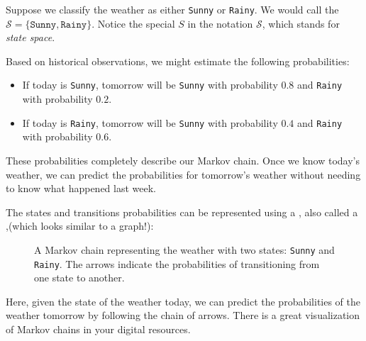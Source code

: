 Suppose we classify the weather as either \texttt{Sunny} or \texttt{Rainy}. We would call the  $\mathcal{S} = \{\texttt{Sunny}, \texttt{Rainy}\}$. Notice the special $S$ in the notation $\mathcal{S}$, which stands for \textit{state space}.

Based on historical observations, we might estimate the following probabilities:

\begin{itemize}
    \item If today is \texttt{Sunny}, tomorrow will be \texttt{Sunny} with probability $0.8$ and \texttt{Rainy} with probability $0.2$.
    \item If today is \texttt{Rainy}, tomorrow will be \texttt{Sunny} with probability $0.4$ and \texttt{Rainy} with probability $0.6$.
\end{itemize}

These probabilities completely describe our Markov chain. Once we know today's weather, we can predict the probabilities for tomorrow's weather without needing to know what happened last week.

The states and transitions probabilities can be represented using a , also called a ,(which looks similar to a graph!):

\begin{figure}[H]
    \centering

    \caption{A Markov chain representing the weather with two states: \texttt{Sunny} and \texttt{Rainy}. The arrows indicate the probabilities of transitioning from one state to another.}
    \label{fig:markov_1}
\end{figure}
Here, given the state of the weather today, we can predict the probabilities of the weather tomorrow by following the chain of arrows. There is a great visualization of Markov chains in your digital resources.

